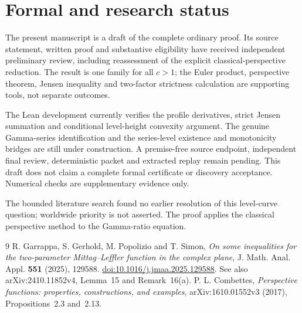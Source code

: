 \documentclass[11pt]{article}
\begin{document}
\section{Formal and research status}
The present manuscript is a draft of the complete ordinary proof.
Its source statement, written proof and substantive eligibility have received
independent preliminary review, including reassessment of the explicit
classical-perspective reduction. The result is one family for all $c>1$;
the Euler product, perspective theorem, Jensen inequality and two-factor
strictness calculation are supporting tools, not separate outcomes.

The Lean development currently verifies the profile derivatives, strict
Jensen summation and conditional level-height convexity argument. The
genuine Gamma-series identification and the series-level existence and
monotonicity bridges are still under construction. A premise-free source
endpoint, independent final review, deterministic packet and extracted replay
remain pending. This draft does not claim a complete formal certificate or
discovery acceptance. Numerical checks are supplementary evidence only.

The bounded literature search found no earlier resolution of this level-curve
question; worldwide priority is not asserted. The proof applies the classical
perspective method to the Gamma-ratio equation.

\begin{thebibliography}{9}
 R. Garrappa, S. Gerhold, M. Popolizio and T. Simon,
\emph{On some inequalities for the two-parameter Mittag--Leffler function
in the complex plane}, J. Math. Anal. Appl. \textbf{551} (2025), 129588.
\href{https://doi.org/10.1016/j.jmaa.2025.129588}{doi:10.1016/j.jmaa.2025.129588}.
See also arXiv:2410.11852v4, Lemma~15 and Remark~16(a).
 P. L. Combettes,
\emph{Perspective functions: properties, constructions, and examples},
arXiv:1610.01552v3 (2017), Propositions~2.3 and~2.13.
\end{thebibliography}
\end{document}
